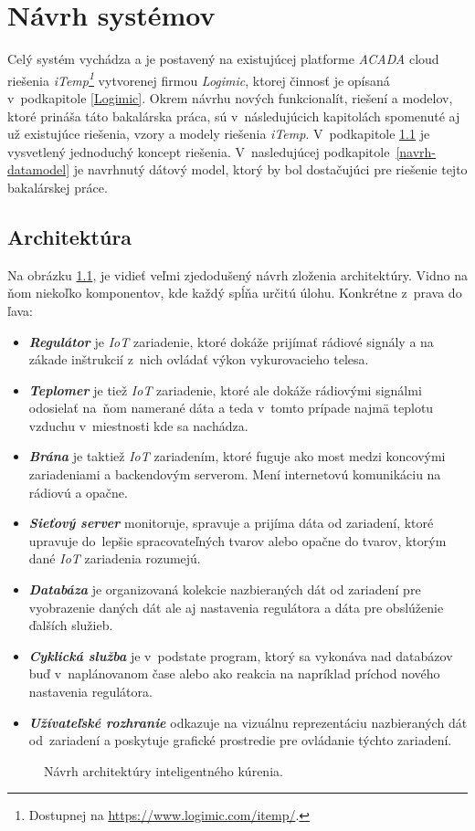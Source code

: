 \chapter{Návrh systémov}\label{navrh}
Celý systém vychádza a je postavený na existujúcej platforme \emph{ACADA} cloud riešenia \emph{iTemp\footnote{Dostupnej na \url{https://www.logimic.com/itemp/}.}} vytvorenej firmou \emph{Logimic}, ktorej činnosť je opísaná v~podkapitole \ref{Logimic}.
Okrem návrhu nových funkcionalít, riešení a modelov, ktoré prináša táto bakalárska práca, sú v~následujúcich kapitolách spomenuté aj už existujúce riešenia, vzory a modely riešenia \emph{iTemp}. 
V~podkapitole \ref{navrh-architektura} je vysvetlený jednoduchý koncept riešenia. 
V~nasledujúcej podkapitole~\ref{navrh-datamodel} je navrhnutý dátový model, ktorý by bol dostačujúci pre riešenie tejto bakalárskej práce.


\section{Architektúra}\label{navrh-architektura}
Na obrázku \ref{fig:designedArch}, je vidieť veľmi zjedodušený návrh zloženia architektúry. Vidno na ňom niekoľko komponentov, kde každý spĺňa určitú úlohu. Konkrétne z~prava do ľava:\begin{itemize}
    \item \textbf{\emph{Regulátor}} je \emph{IoT} zariadenie, ktoré dokáže prijímať rádiové signály a na zákade inštrukcií z~nich ovládať výkon vykurovacieho telesa.
    \item \textbf{\emph{Teplomer}} je tiež \emph{IoT} zariadenie, ktoré ale dokáže rádiovými signálmi odosielať na~ňom namerané dáta a teda v~tomto prípade najmä teplotu vzduchu v~miestnosti kde sa nachádza.
    \item \textbf{\emph{Brána}} je taktiež \emph{IoT} zariadením, ktoré fuguje ako most medzi koncovými zariadeniami a backendovým serverom. Mení internetovú komunikáciu na rádiovú a opačne.
    \item \textbf{\emph{Sieťový server}} monitoruje, spravuje a prijíma dáta od zariadení, ktoré upravuje do~lepšie spracovateľných tvarov alebo opačne do tvarov, ktorým dané \emph{IoT} zariadenia rozumejú.
    \item \textbf{\emph{Databáza}} je organizovaná kolekcie nazbieraných dát od zariadení pre vyobrazenie daných dát ale aj nastavenia regulátora a dáta pre obslúženie ďalších služieb.
    \item \textbf{\emph{Cyklická služba}} je v~podstate program, ktorý sa vykonáva nad databázov buď v~naplánovanom čase alebo ako reakcia na napríklad príchod nového nastavenia regulátora. 
    \item \textbf{\emph{Užívateľské rozhranie}} odkazuje na vizuálnu reprezentáciu nazbieraných dát od~zariadení a poskytuje grafické prostredie pre ovládanie týchto zariadení.
\end{itemize}
\begin{figure}[h!]
    \centering
    
    \caption{Návrh architektúry inteligentného kúrenia.}
    \label{fig:designedArch}
\end{figure}
